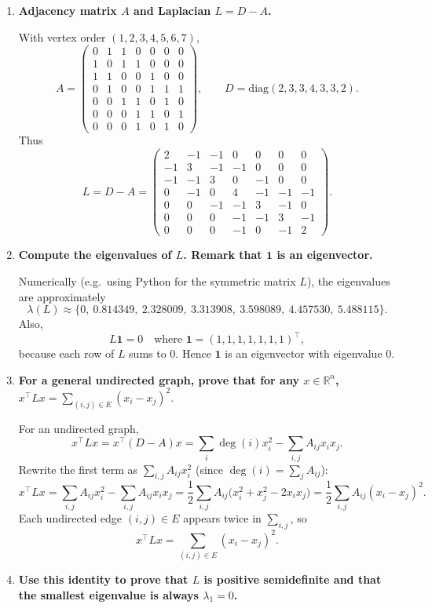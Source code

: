 \documentclass[11pt]{article}
\newcommand{\R}{\mathbb{R}}
\begin{document}
\begin{enumerate}[label=(\alph*)]
\item \textbf{Adjacency matrix $A$ and Laplacian $L=D-A$.}

With vertex order $(1,2,3,4,5,6,7)$,
\[
A=
\begin{pmatrix}
0&1&1&0&0&0&0\\
1&0&1&1&0&0&0\\
1&1&0&0&1&0&0\\
0&1&0&0&1&1&1\\
0&0&1&1&0&1&0\\
0&0&0&1&1&0&1\\
0&0&0&1&0&1&0
\end{pmatrix},
\qquad
D=\mathrm{diag}(2,3,3,4,3,3,2).
\]
Thus
\[
L=D-A=
\begin{pmatrix}
2&-1&-1&0&0&0&0\\
-1&3&-1&-1&0&0&0\\
-1&-1&3&0&-1&0&0\\
0&-1&0&4&-1&-1&-1\\
0&0&-1&-1&3&-1&0\\
0&0&0&-1&-1&3&-1\\
0&0&0&-1&0&-1&2
\end{pmatrix}.
\]

\item \textbf{Compute the eigenvalues of $L$. Remark that $\bm 1$ is an eigenvector.}

Numerically (e.g.\ using Python for the symmetric matrix $L$), the eigenvalues are approximately
\[
\lambda(L)\approx
\{0,\ 0.814349,\ 2.328009,\ 3.313908,\ 3.598089,\ 4.457530,\ 5.488115\}.
\]
Also,
\[
L\bm 1 = 0\quad\text{where }\bm 1=(1,1,1,1,1,1,1)^\top,
\]
because each row of $L$ sums to $0$. Hence $\bm 1$ is an eigenvector with eigenvalue $0$.

\item \textbf{For a general undirected graph, prove that for any $x\in\R^n$,
\(
x^\top L x = \sum_{(i,j)\in E}(x_i-x_j)^2.
\)
}

For an undirected graph,
\[
x^\top L x = x^\top(D-A)x
= \sum_{i}\deg(i)x_i^2 - \sum_{i,j}A_{ij}x_i x_j.
\]
Rewrite the first term as $\sum_{i,j}A_{ij}x_i^2$ (since $\deg(i)=\sum_j A_{ij}$):
\[
x^\top L x
= \sum_{i,j}A_{ij}x_i^2 - \sum_{i,j}A_{ij}x_i x_j
= \frac12\sum_{i,j}A_{ij}\bigl(x_i^2+x_j^2-2x_i x_j\bigr)
= \frac12\sum_{i,j}A_{ij}(x_i-x_j)^2.
\]
Each undirected edge $(i,j)\in E$ appears twice in $\sum_{i,j}$, so
\[
x^\top L x = \sum_{(i,j)\in E}(x_i-x_j)^2.
\]

\item \textbf{Use this identity to prove that $L$ is positive semidefinite and that the smallest eigenvalue is always $\lambda_1=0$.}


\end{enumerate}
\end{document}
